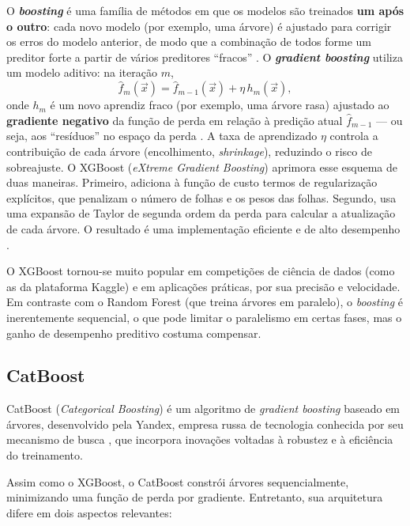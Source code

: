 O \textbf{\textit{boosting}} é uma família de métodos em que os modelos são treinados \textbf{um após o outro}: cada novo modelo (por exemplo, uma árvore) é ajustado para corrigir os erros do modelo anterior, de modo que a combinação de todos forme um preditor forte a partir de vários preditores ``fracos'' \citep{geron2019maos, Levada2026}. O \textbf{\textit{gradient boosting}} utiliza um modelo aditivo: na iteração \(m\),
\begin{equation}
\hat{f}_m(\vec{x}) = \hat{f}_{m-1}(\vec{x}) + \eta \, h_m(\vec{x}),
\end{equation}
onde \(h_m\) é um novo aprendiz fraco (por exemplo, uma árvore rasa) ajustado ao \textbf{gradiente negativo} da função de perda em relação à predição atual \(\hat{f}_{m-1}\) --- ou seja, aos ``resíduos'' no espaço da perda \citep{geron2019maos}. A taxa de aprendizado \(\eta\) controla a contribuição de cada árvore (encolhimento, \textit{shrinkage}), reduzindo o risco de sobreajuste. O XGBoost (\textit{eXtreme Gradient Boosting}) \citep{Chen2016} aprimora esse esquema de duas maneiras. Primeiro, adiciona à função de custo termos de regularização explícitos, que penalizam o número de folhas e os pesos das folhas. Segundo, usa uma expansão de Taylor de segunda ordem da perda para calcular a atualização de cada árvore. O resultado é uma implementação eficiente e de alto desempenho \citep{geron2019maos}.

O XGBoost tornou-se muito popular em competições de ciência de dados (como as da plataforma Kaggle) e em aplicações práticas, por sua precisão e velocidade. Em contraste com o Random Forest (que treina árvores em paralelo), o \textit{boosting} é inerentemente sequencial, o que pode limitar o paralelismo em certas fases, mas o ganho de desempenho preditivo costuma compensar.

\subsection{CatBoost}

CatBoost (\textit{Categorical Boosting}) é um algoritmo de \textit{gradient boosting} baseado em árvores, desenvolvido pela Yandex, empresa russa de tecnologia conhecida por seu mecanismo de busca \citep{Prokhorenkova2018}, que incorpora inovações voltadas à robustez e à eficiência do treinamento.

Assim como o XGBoost, o CatBoost constrói árvores sequencialmente, minimizando uma função de perda por gradiente. Entretanto, sua arquitetura difere em dois aspectos relevantes:

